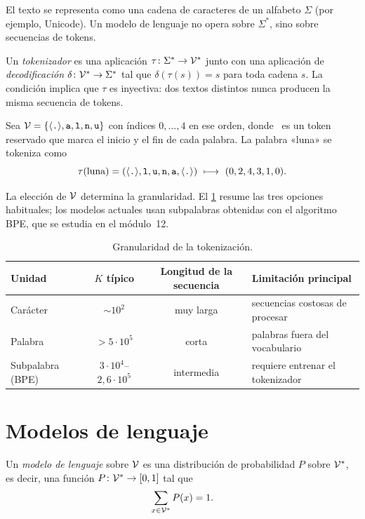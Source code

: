 El texto se representa como una cadena de caracteres de un alfabeto $\Sigma$ (por ejemplo, Unicode). Un modelo de lenguaje no opera sobre $\Sigma^{*}$, sino sobre secuencias de tokens.

\begin{definicion}[Tokenizador]
Un \emph{tokenizador} es una aplicación $\tau\colon\Sigma^{*}\to\mathcal{V}^{*}$ junto con una aplicación de \emph{decodificación} $\delta\colon\mathcal{V}^{*}\to\Sigma^{*}$ tal que $\delta(\tau(s))=s$ para toda cadena $s$. La condición implica que $\tau$ es inyectiva: dos textos distintos nunca producen la misma secuencia de tokens.
\end{definicion}

\begin{ejemplo}\label{ej:luna}
Sea $\mathcal{V}=\{\langle\texttt{.}\rangle,\texttt{a},\texttt{l},\texttt{n},\texttt{u}\}$ con índices $0,\dots,4$ en ese orden, donde \fin\ es un token reservado que marca el inicio y el fin de cada palabra. La palabra «luna» se tokeniza como
\[
\tau(\text{luna})=(\fin,\texttt{l},\texttt{u},\texttt{n},\texttt{a},\fin)\ \longmapsto\ (0,2,4,3,1,0).
\]
\end{ejemplo}

La elección de $\mathcal{V}$ determina la granularidad. El \cref{tab:granularidad} resume las tres opciones habituales; los modelos actuales usan subpalabras obtenidas con el algoritmo BPE, que se estudia en el módulo~12.

\begin{table}[h]
\centering\small
\caption{Granularidad de la tokenización.}\label{tab:granularidad}
\begin{tabular}{@{}lccl@{}}
\toprule
Unidad & $K$ típico & Longitud de la secuencia & Limitación principal \\
\midrule
Carácter & $\sim 10^{2}$ & muy larga & secuencias costosas de procesar \\
Palabra & $>5\cdot 10^{5}$ & corta & palabras fuera del vocabulario \\
Subpalabra (BPE) & $3\cdot 10^{4}$–$2{,}6\cdot 10^{5}$ & intermedia & requiere entrenar el tokenizador \\
\bottomrule
\end{tabular}
\end{table}

\section{Modelos de lenguaje}

\begin{definicion}\label{def:ml}
Un \emph{modelo de lenguaje} sobre $\mathcal{V}$ es una distribución de probabilidad $P$ sobre $\mathcal{V}^{*}$, es decir, una función $P\colon\mathcal{V}^{*}\to[0,1]$ tal que
\[
\sum_{x\in\mathcal{V}^{*}}P(x)=1.
\]
\end{definicion}

